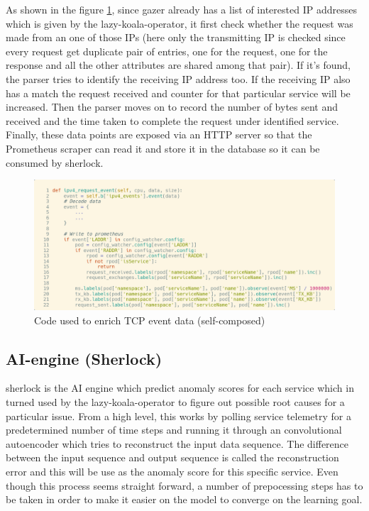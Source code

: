As shown in the figure \ref{fig:gazer-enrich}, since \ac{gazer} already has a list of interested IP addresses which is given by the \ac{lazy-koala-operator}, it first check whether the request was made from an one of those IPs (here only the transmitting IP is checked since every request get duplicate pair of entries, one for the request, one for the response and all the other attributes are shared among that pair). If it's found, the parser tries to identify the receiving IP address too. If the receiving IP also has a match the request received and counter for that particular service will be increased. Then the parser moves on to record the number of bytes sent and received and the time taken to complete the request under identified service. Finally, these data points are exposed via an HTTP server so that the Prometheus scraper can read it and store it in the database so it can be consumed by \ac{sherlock}.

\begin{figure}[H]
    \includegraphics[width=14cm]{assets/implementation/gazer-enrich.png}
    \caption{Code used to enrich TCP event data (self-composed)}
    \label{fig:gazer-enrich}
\end{figure}


\subsection{AI-engine (Sherlock)}

\ac{sherlock} is the AI engine which predict anomaly scores for each service which in turned used by the \ac{lazy-koala-operator} to figure out possible root causes for a particular issue. From a high level, this works by polling service telemetry for a predetermined number of time steps and running it through an convolutional autoencoder which tries to reconstruct the input data sequence. The difference between the input sequence and output sequence is called the reconstruction error and this will be use as the anomaly score for this specific service. Even though this process seems straight forward, a number of prepocessing steps has to be taken in order to make it easier on the model to converge on the learning goal.

